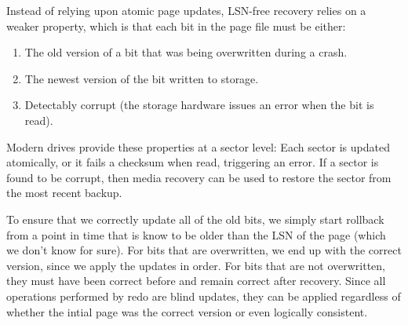 \documentclass[letterpaper,twocolumn,10pt]{article}
\newcommand{\eat}[1]{}
\begin{document}
Instead of relying upon atomic page updates, LSN-free recovery relies
on a weaker property, which is that each bit in the page file must
be either:
\begin{enumerate}
\item The old version of a bit that was being overwritten during a crash.
\item The newest version of the bit written to storage.
\item Detectably corrupt (the storage hardware issues an error when the
  bit is read).
\end{enumerate}

Modern drives provide these properties at a sector level: Each sector
is updated atomically, or it fails a checksum when read, triggering an
error.  If a sector is found to be corrupt, then media recovery can be
used to restore the sector from the most recent backup.

To ensure that we correctly update all of the old bits, we simply
start rollback from a point in time that is know to be older than the
LSN of the page (which we don't know for sure).  For bits that are
overwritten, we end up with the correct version, since we apply the
updates in order.  For bits that are not overwritten, they must have
been correct before and remain correct after recovery.  Since all
operations performed by redo are blind updates, they can be applied
regardless of whether the intial page was the correct version or even
logically consistent.


\eat{ Figure~\ref{fig:todo} provides an example page, and a number of
log entries that were applied to it.  Assume that the initial version
of the page, with LSN $0$, is on disk, and the disk is in the process
of writing out the version with LSN $2$ when the system crashes.  When
recovery reads the page from disk, it may encounter any combination of
sectors from these two versions.

Note that the first and last two sectors are not overwritten by any
of the log entries that Redo will play back.  Therefore, their value
is unchanged in both versions of the page.  Since Redo will not change
them, we know that they will have the correct value when it completes.
The remainder of the sectors are overwritten at some point in the log.
If we constrain the updates to overwrite an entire sector at once, then
the initial on-disk value of these sectors would not have any affect
on the outcome of Redo.  Furthermore, since the redo entries are
played back in order, each sector would contain the most up to date
version after redo.

Of course, we do not want to constrain log entries to update entire
sectors at once.  In order to support finer-grained logging, we simply
repeat the above argument on the byte or bit level.  Each bit is
either overwritten by redo, or has a known, correct, value before
redo.
}
\end{document}
